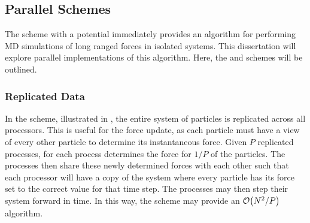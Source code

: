 \subsection{Parallel Schemes}

%
The \velocityverlet{} scheme with a \twobody{} potential
immediately provides an algorithm for
performing MD simulations of long ranged forces in isolated systems.
%
This dissertation will explore parallel implementations of this algorithm.
%
Here, the \replicateddata{} and \systolicloop{} schemes will be outlined.



\subsubsection{Replicated Data}
\label{sec:background:subsec:replicated_data}

%
In the \replicateddata{} scheme, illustrated in
,
the entire system of particles is replicated across all processors.
%
This is useful for the force update, as each particle must have a view of
every other particle to determine its instantaneous force.
%
Given $P$ replicated processes, for each process
determines the force for $1/P$ of the particles.
%
The processes then share these newly determined forces with each other
such that each processor will have a copy of the system where every
particle has its force set to the correct value for that time step.
%
The processes may then step their system forward in time.
%
In this way, the \replicateddata{} scheme may provide
an $\mathcal{O}{\left({ N^2/P }\right)}$ algorithm.


